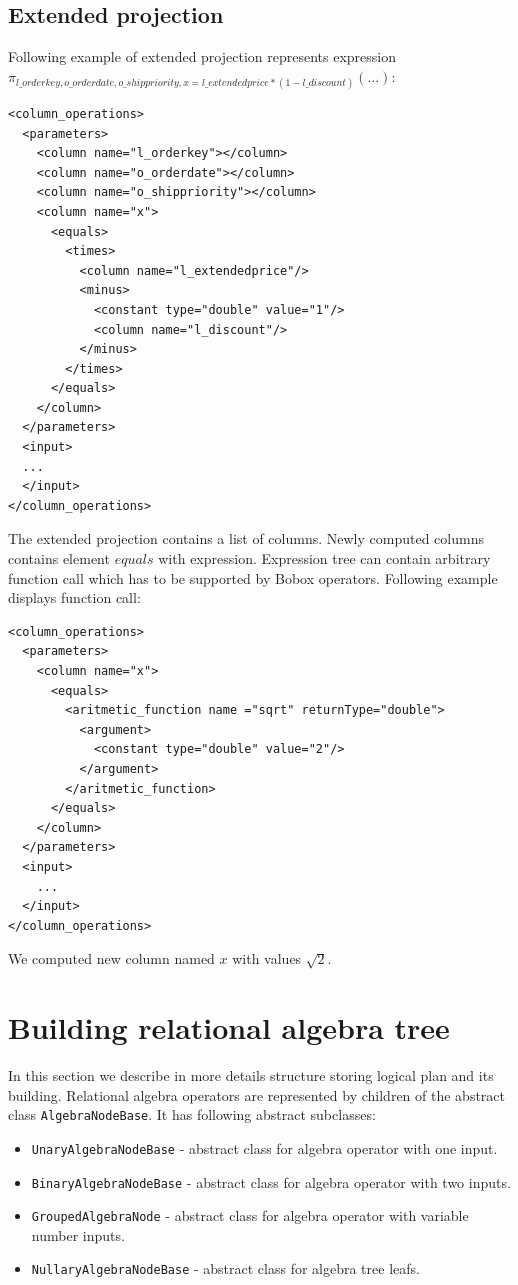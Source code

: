 \subsection{Extended projection}
Following example of extended projection represents expression \\ $\pi_{l\_orderkey,o\_orderdate,o\_shippriority,x=l\_extendedprice*(1-l\_discount)}(...)$:
\begin{lstlisting}
<column_operations>
  <parameters>
    <column name="l_orderkey"></column>
    <column name="o_orderdate"></column>
    <column name="o_shippriority"></column>
    <column name="x">
      <equals>
        <times>
          <column name="l_extendedprice"/>
          <minus>
            <constant type="double" value="1"/>
            <column name="l_discount"/>
          </minus>
        </times>
      </equals>
    </column>
  </parameters>
  <input>
  ...
  </input>
</column_operations>
\end{lstlisting}

The extended projection contains a list of columns. Newly computed columns contains element $equals$ with expression. Expression tree can contain arbitrary function call which has to be supported by Bobox operators. Following example displays function call:


\begin{lstlisting}
<column_operations>
  <parameters>
    <column name="x">
      <equals>
        <aritmetic_function name ="sqrt" returnType="double">
          <argument>
            <constant type="double" value="2"/>
          </argument>
        </aritmetic_function>
      </equals>
    </column>
  </parameters>
  <input>
    ...
  </input>
</column_operations>
\end{lstlisting}
 
 We computed new column named $x$ with values $\sqrt{2}$.
 
\section{Building relational algebra tree} 

In this section we describe in more details structure storing logical plan and its building. Relational algebra operators are represented by children of the abstract class \texttt{AlgebraNodeBase}. It has following abstract subclasses:
\begin{itemize}

\item \texttt{UnaryAlgebraNodeBase} - abstract class for algebra operator with one input.

\item \texttt{BinaryAlgebraNodeBase}  - abstract class for algebra operator with two inputs.

\item \texttt{GroupedAlgebraNode} - abstract class for algebra operator with variable number inputs.

\item \texttt{NullaryAlgebraNodeBase} -  abstract class for algebra tree leafs.

\end{itemize}

